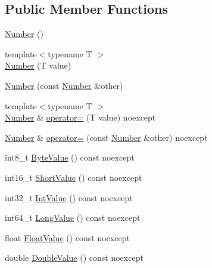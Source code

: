 \subsection*{Public Member Functions}
\begin{DoxyCompactItemize}
\item 
\mbox{\hyperlink{classlucene_1_1core_1_1util_1_1etc_1_1Number_a5d7eabb8699667fe8129495862143acc}{Number}} ()
\item 
{\footnotesize template$<$typename T $>$ }\\\mbox{\hyperlink{classlucene_1_1core_1_1util_1_1etc_1_1Number_a07d36c50311711e7db569330df6cfe17}{Number}} (T value)
\item 
\mbox{\hyperlink{classlucene_1_1core_1_1util_1_1etc_1_1Number_a6e50b07326be915f3e3357b842d11cac}{Number}} (const \mbox{\hyperlink{classlucene_1_1core_1_1util_1_1etc_1_1Number}{Number}} \&other)
\item 
{\footnotesize template$<$typename T $>$ }\\\mbox{\hyperlink{classlucene_1_1core_1_1util_1_1etc_1_1Number}{Number}} \& \mbox{\hyperlink{classlucene_1_1core_1_1util_1_1etc_1_1Number_ac220e8c269757c53d52f45d048373bf5}{operator=}} (T value) noexcept
\item 
\mbox{\hyperlink{classlucene_1_1core_1_1util_1_1etc_1_1Number}{Number}} \& \mbox{\hyperlink{classlucene_1_1core_1_1util_1_1etc_1_1Number_a5a8f8f217e54fb57dfc4486438bce1b2}{operator=}} (const \mbox{\hyperlink{classlucene_1_1core_1_1util_1_1etc_1_1Number}{Number}} \&other) noexcept
\item 
int8\+\_\+t \mbox{\hyperlink{classlucene_1_1core_1_1util_1_1etc_1_1Number_acdd897f62b5a03d6226b8286467acb59}{Byte\+Value}} () const noexcept
\item 
int16\+\_\+t \mbox{\hyperlink{classlucene_1_1core_1_1util_1_1etc_1_1Number_aa7e289de5f45ac8b2e4a8a881d082c5b}{Short\+Value}} () const noexcept
\item 
int32\+\_\+t \mbox{\hyperlink{classlucene_1_1core_1_1util_1_1etc_1_1Number_aa5a0415286a2a4ff80551a30653a1b12}{Int\+Value}} () const noexcept
\item 
int64\+\_\+t \mbox{\hyperlink{classlucene_1_1core_1_1util_1_1etc_1_1Number_a2ef5ca9ccb2e3a3cf25be161b602b8d3}{Long\+Value}} () const noexcept
\item 
float \mbox{\hyperlink{classlucene_1_1core_1_1util_1_1etc_1_1Number_a435fdb75a6ad263c017b29d3c2affd3f}{Float\+Value}} () const noexcept
\item 
double \mbox{\hyperlink{classlucene_1_1core_1_1util_1_1etc_1_1Number_aa48afc59333d45b96318699d484d1161}{Double\+Value}} () const noexcept
\end{DoxyCompactItemize}
